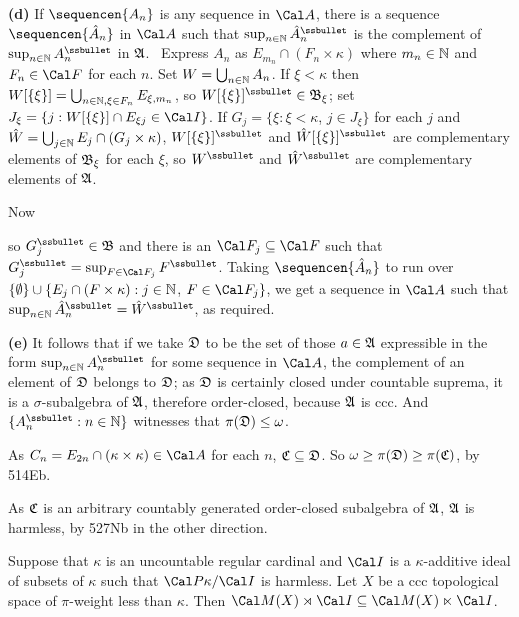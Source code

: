 {\medskip

{\bf (d)} If $\sequencen{A_n}$ is any sequence in $\Cal A$, there is a sequence
$\sequencen{\hat A_n}$ in $\Cal A$ such that
$\sup_{n\in\Bbb N}\hat A_n^{\ssbullet}$
is the complement of $\sup_{n\in\Bbb N}A_n^{\ssbullet}$ in $\frak A$.
\Prf\ Express
$A_n$ as $E_{m_n}\cap(F_n\times\kappa)$ where $m_n\in\Bbb N$ and
$F_n\in\Cal F$ for
each $n$.   Set $W=\bigcup_{n\in\Bbb N}A_n$.   If $\xi<\kappa$ then
$W[\{\xi\}]=\bigcup_{n\in\Bbb N,\xi\in F_n}E_{\xi,m_n}$, so
$W[\{\xi\}]^{\ssbullet}\in\frak B_{\xi}$;  set
$J_{\xi}=\{j:W[\{\xi\}]\cap E_{\xi j}\in\Cal I\}$.   If
$G_j=\{\xi:\xi<\kappa$, $j\in J_{\xi}\}$ for each $j$ and
$\hat W=\bigcup_{j\in\Bbb N}E_j\cap(G_j\times\kappa)$,
$W[\{\xi\}]^{\ssbullet}$ and $\hat W[\{\xi\}]^{\ssbullet}$ are
complementary elements of
$\frak B_{\xi}$ for each $\xi$, so $W^{\ssbullet}$ and
$\hat W^{\ssbullet}$ are complementary elements of $\frak A$.

Now


\noindent so $G_j^{\ssbullet}\in\frak B$ and there is an
$\Cal F_j\subseteq\Cal F$
such that $G_j^{\ssbullet}=\sup_{F\in\Cal F_j}F^{\ssbullet}$.   Taking
$\sequencen{\hat A_n}$ to run over
$\{\emptyset\}\cup\{E_j\cap(F\times\kappa):j\in\Bbb N$, $F\in\Cal F_j\}$,
we get a sequence in $\Cal A$ such that
$\sup_{n\in\Bbb N}\hat A_n^{\ssbullet}=\hat W^{\ssbullet}$, as required.\
\Qed

\medskip

{\bf (e)} It follows that if we take $\frak D$ to be the set of those
$a\in\frak A$
expressible in the form $\sup_{n\in\Bbb N}A_n^{\ssbullet}$ for some
sequence in
$\Cal A$, the complement of an element of $\frak D$ belongs to $\frak D$;  as
$\frak D$ is certainly closed under countable suprema,
it is a $\sigma$-subalgebra of $\frak A$, therefore order-closed, because
$\frak A$ is ccc.
And $\{A_n^{\ssbullet}:n\in\Bbb N\}$ witnesses that
$\pi(\frak D)\le\omega$.

As $C_n=E_{2n}\cap(\kappa\times\kappa)\in\Cal A$ for each $n$,
$\frak C\subseteq\frak D$.   So
$\omega\ge\pi(\frak D)\ge\pi(\frak C)$, by 514Eb.

As $\frak C$ is an arbitrary countably generated order-closed subalgebra
of $\frak A$, $\frak A$ is harmless, by 527Nb in the other direction.
}%

 Suppose that $\kappa$ is an uncountable
regular cardinal
and $\Cal I$ is a $\kappa$-additive ideal of subsets of $\kappa$ such that
$\Cal P\kappa/\Cal I$ is harmless.   Let $X$ be a
ccc topological space of $\pi$-weight less than $\kappa$.   Then
$\Cal M(X)\rtimes\Cal I\subseteq\Cal M(X)\ltimes\Cal I$.

